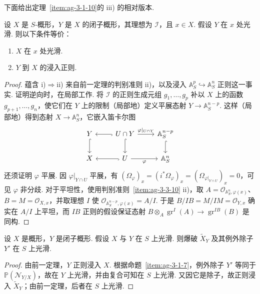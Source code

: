 下面给出定理~\ref{item:ag-3-1-10}的 iii) 的相对版本.
\begin{theorem}\label{item:ag-3-4-12}
设 $X$ 是 $S$-概形，$Y$ 是 $X$ 的闭子概形，其理想为 $\mathcal I$，且 $x\in X$. 假设 $Y$ 在 $x$ 处光滑. 则以下条件等价：
\begin{enumerate}[label=\roman*)]
\item $X$ 在 $x$ 处光滑.
\item $Y$ 到 $X$ 的浸入正则.
\end{enumerate}
\end{theorem}
\begin{proof}
蕴含 i)$\Rightarrow$ii) 来自前一定理的判别准则 ii)，以及浸入 $\mathbb A_S^p\hookrightarrow\mathbb A_S^n$ 正则这一事实.
证明逆向时，在局部工作. 将 $\mathcal I$ 的正则生成元组 $g_1,\ldots,g_p$ 补以 $X$ 上的函数 $g_{p+1},\ldots,g_n$，使它们在 $Y$ 上的限制（局部地）定义平展态射 $Y\longrightarrow\mathbb A_S^{n-p}$. 这样（局部地）得到态射
$X\longrightarrow\mathbb A_S^n$，它嵌入笛卡尔图
\begin{align*}
\begin{tikzcd}[ampersand replacement=\&]
Y\arrow[d,hook] \& U\cap Y\arrow[l,hook]\arrow[r,"\varphi|_{U\cap Y}"]\arrow[d,hook] \& \mathbb A_S^{n-p}\arrow[d,hook]\\
X \& U\arrow[l,hook]\arrow[r,"\varphi"'] \& \mathbb A_S^n
\end{tikzcd}
\end{align*}
还须证明 $\varphi$ 平展. 因 $\varphi|_{Y\cap U}$ 平展，有 $(\Omega_\varphi)_x=(i^*\Omega_\varphi)_x=(\Omega_{\varphi|_{Y\cap U}})_x=0$，可见 $\varphi$ 非分歧. 对于平坦性，使用判别准则~\ref{item:ag-3-3-10} ii)，取 $A=\mathcal O_{\mathbb A_S^n,\varphi(x)}$、$B=M=\mathcal O_{X,x}$，并取理想 $I$ 使 $\mathcal O_{\mathbb A_S^{n-p},\varphi(x)}=A/I$. 于是 $B/IB=M/IM=\mathcal O_{Y,x}$ 确实在 $A/I$ 上平坦，而 $IB$ 正则的假设保证态射 $B\otimes_A\operatorname{gr}^{I}(A)\longrightarrow\operatorname{gr}^{IB}(B)$ 是同构.
\end{proof}
\begin{corollary}\label{item:ag-3-4-13}
设 $X$ 是概形，$Y$ 是闭子概形. 假设 $X$ 与 $Y$ 在 $S$ 上光滑. 则爆破 $\widetilde X_Y$ 及其例外除子 $Y'$ 在 $S$ 上光滑.
\end{corollary}
\begin{proof}
由前一定理，$Y$ 正则浸入 $X$. 根据命题~\ref{item:ag-3-1-7}，例外除子 $Y'$ 等同于 $\mathbb P(\mathcal N_{Y/X})$，故在 $Y$ 上光滑，并由复合可知在 $S$ 上光滑. 又因它是除子，故正则浸入 $\widetilde X_Y$；由前一定理，后者在 $S$ 上光滑.
\end{proof}
